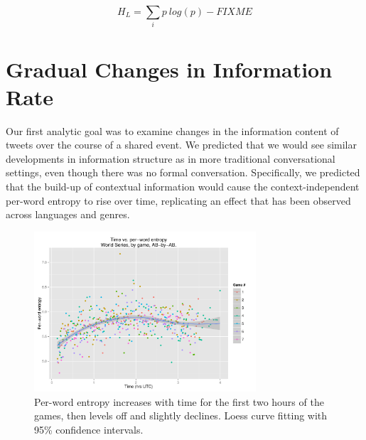 \documentclass[11pt,letterpaper]{article}
\begin{document}
\begin{equation}
H_L = \sum_i{p ~ log(p)} - FIXME
\end{equation}

\section{Gradual Changes in Information Rate}

Our first analytic goal was to examine changes in the information content of tweets over the course of a shared event.  We predicted that we would see similar developments in information structure as in more traditional conversational settings, even though there was no formal conversation.  Specifically, we predicted that the build-up of contextual information would cause the context-independent per-word entropy to rise over time, replicating an effect that has been observed across languages and genres\cite{genzel2002,genzel2003,qian2012}.

\begin{figure}
 \centering
  \includegraphics[width=3.25in]{figures/time-perword-ent-agg}
 \caption{Per-word entropy increases with time for the first two hours of the games, then levels off and slightly declines. Loess curve fitting with 95\% confidence intervals.}\label{fig:time-perword-ent}\vspace*{-.5em}
\end{figure}
\end{document}
